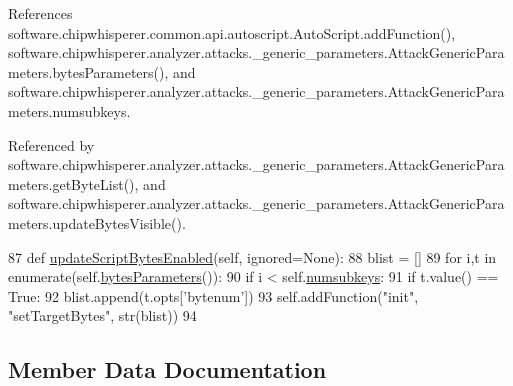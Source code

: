 References software.\+chipwhisperer.\+common.\+api.\+autoscript.\+Auto\+Script.\+add\+Function(), software.\+chipwhisperer.\+analyzer.\+attacks.\+\_\+generic\+\_\+parameters.\+Attack\+Generic\+Parameters.\+bytes\+Parameters(), and software.\+chipwhisperer.\+analyzer.\+attacks.\+\_\+generic\+\_\+parameters.\+Attack\+Generic\+Parameters.\+numsubkeys.



Referenced by software.\+chipwhisperer.\+analyzer.\+attacks.\+\_\+generic\+\_\+parameters.\+Attack\+Generic\+Parameters.\+get\+Byte\+List(), and software.\+chipwhisperer.\+analyzer.\+attacks.\+\_\+generic\+\_\+parameters.\+Attack\+Generic\+Parameters.\+update\+Bytes\+Visible().


\begin{DoxyCode}
87     \textcolor{keyword}{def }\hyperlink{classsoftware_1_1chipwhisperer_1_1analyzer_1_1attacks_1_1__generic__parameters_1_1AttackGenericParameters_a8226897875845b078a9a68fc42973a84}{updateScriptBytesEnabled}(self, ignored=None):
88         blist = []
89         \textcolor{keywordflow}{for} i,t \textcolor{keywordflow}{in} enumerate(self.\hyperlink{classsoftware_1_1chipwhisperer_1_1analyzer_1_1attacks_1_1__generic__parameters_1_1AttackGenericParameters_aec590b908b8c3ddf781b2497957e9b84}{bytesParameters}()):
90             \textcolor{keywordflow}{if} i < self.\hyperlink{classsoftware_1_1chipwhisperer_1_1analyzer_1_1attacks_1_1__generic__parameters_1_1AttackGenericParameters_aed19c974ec412f46ba6f21a2d7c60852}{numsubkeys}:
91                 \textcolor{keywordflow}{if} t.value() == \textcolor{keyword}{True}:
92                     blist.append(t.opts[\textcolor{stringliteral}{'bytenum'}])
93         self.addFunction(\textcolor{stringliteral}{"init"}, \textcolor{stringliteral}{"setTargetBytes"}, str(blist))
94 
\end{DoxyCode}


\subsection{Member Data Documentation}
\hypertarget{classsoftware_1_1chipwhisperer_1_1analyzer_1_1attacks_1_1__generic__parameters_1_1AttackGenericParameters_a3b3f81276a3845aaf1449d948ea99b9b}{}
